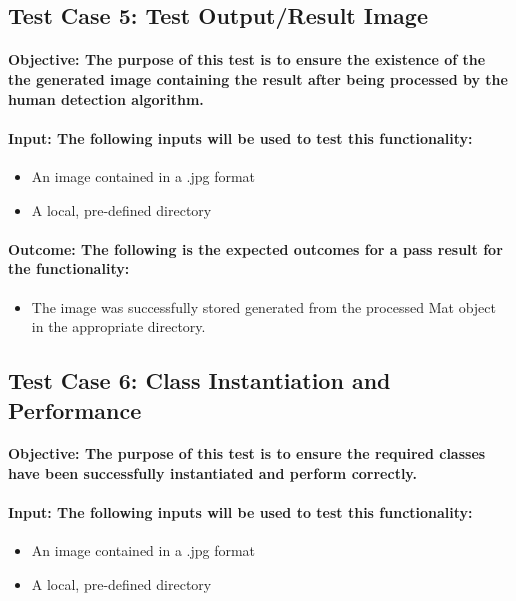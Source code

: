 \documentclass[a4paper,12pt]{report}
\begin{document}
	\subsection{Test Case 5: Test Output/Result Image}
	\paragraph{Objective: The purpose of this test is to ensure the existence of the the generated image containing the result after being processed by the human detection algorithm.}
	\paragraph{Input: The following inputs will be used to test this functionality:}
	\begin{itemize}
		\item An image contained in a .jpg format
		\item A local, pre-defined directory
	\end{itemize}
	\paragraph{Outcome: The following is the expected outcomes for a pass result for the functionality:}
	\begin{itemize}
		\item The image was successfully stored generated from the processed Mat object in the appropriate directory.
	\end{itemize}
	
	\subsection{Test Case 6: Class Instantiation and Performance}
	\paragraph{Objective: The purpose of this test is to ensure the required classes have been successfully instantiated and perform correctly.}
	\paragraph{Input: The following inputs will be used to test this functionality:}
	\begin{itemize}
		\item An image contained in a .jpg format
		\item A local, pre-defined directory
	\end{itemize}
\end{document}
